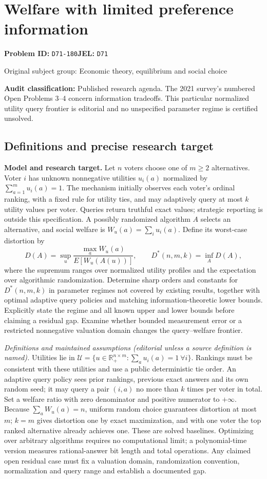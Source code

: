 \documentclass[11pt,a4paper]{article}
\begin{document}
\section*{Welfare with limited preference information}
\textbf{Problem ID:} \texttt{D71-180}\quad \textbf{JEL:} \texttt{D71}\par
\label{problem:OP-0279}
{\sffamily\small\color{muted}Original subject group: Economic theory, equilibrium and social choice\par}
\label{definitions:problem:30007561}
\textbf{Audit classification:} Published research agenda. The 2021 survey’s numbered Open Problems 3–4 concern information tradeoffs. This particular normalized utility query frontier is editorial and no unspecified parameter regime is certified unsolved.
\subsection*{Definitions and precise research target}
\textbf{Model and research target.} Let \(n\) voters choose one of \(m\geq2\) alternatives. Voter \(i\) has unknown nonnegative utilities \(u_i(a)\) normalized by \(\sum_{a=1}^m u_i(a)=1\). The mechanism initially observes each voter's ordinal ranking, with a fixed rule for utility ties, and may adaptively query at most \(k\) utility values per voter. Queries return truthful exact values; strategic reporting is outside this specification. A possibly randomized algorithm \(A\) selects an alternative, and social welfare is \(W_u(a)=\sum_i u_i(a)\). Define its worst-case distortion by
\[
 D(A)=\sup_u\frac{\max_a W_u(a)}{E[W_u(A(u))]},\qquad
 D^*(n,m,k)=\inf_A D(A),
\]
where the supremum ranges over normalized utility profiles and the expectation over algorithmic randomization. Determine sharp orders and constants for \(D^*(n,m,k)\) in parameter regimes not covered by existing results, together with optimal adaptive query policies and matching information-theoretic lower bounds. Explicitly state the regime and all known upper and lower bounds before claiming a residual gap. Examine whether bounded measurement error or a restricted nonnegative valuation domain changes the query–welfare frontier.

\emph{Definitions and maintained assumptions (editorial unless a source definition is named).} Utilities lie in \(\mathcal U=\{u\in\mathbb R_+^{n\times m}:\sum_a u_i(a)=1\ \forall i\}\). Rankings must be consistent with these utilities and use a public deterministic tie order. An adaptive query policy sees prior rankings, previous exact answers and its own random seed; it may query a pair \((i,a)\) no more than \(k\) times per voter in total. Set a welfare ratio with zero denominator and positive numerator to \(+\infty\). Because \(\sum_a W_u(a)=n\), uniform random choice guarantees distortion at most \(m\); \(k=m\) gives distortion one by exact maximization, and with one voter the top ranked alternative already achieves one. These are solved baselines. Optimizing over arbitrary algorithms requires no computational limit; a polynomial-time version measures rational-answer bit length and total operations. Any claimed open residual case must fix a valuation domain, randomization convention, normalization and query range and establish a documented gap.
\end{document}
